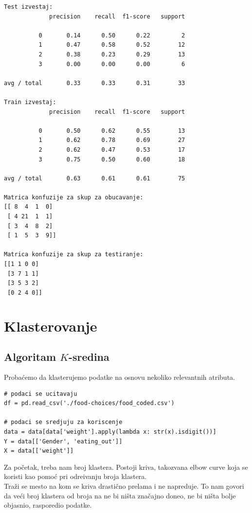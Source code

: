 \documentclass[12pt,a4paper]{article}
\begin{document}
\begin{verbatim}
Test izvestaj:
             precision    recall  f1-score   support

          0       0.14      0.50      0.22         2
          1       0.47      0.58      0.52        12
          2       0.38      0.23      0.29        13
          3       0.00      0.00      0.00         6

avg / total       0.33      0.33      0.31        33

Train izvestaj:
             precision    recall  f1-score   support

          0       0.50      0.62      0.55        13
          1       0.62      0.78      0.69        27
          2       0.62      0.47      0.53        17
          3       0.75      0.50      0.60        18

avg / total       0.63      0.61      0.61        75

Matrica konfuzije za skup za obucavanje:
[[ 8  4  1  0]
 [ 4 21  1  1]
 [ 3  4  8  2]
 [ 1  5  3  9]]

Matrica konfuzije za skup za testiranje:
[[1 1 0 0]
 [3 7 1 1]
 [3 5 3 2]
 [0 2 4 0]]
\end{verbatim}

\newpage

\section{Klasterovanje}

\subsection{Algoritam $K$-sredina}
Proba\' cemo da klasterujemo podatke na osnovu nekoliko relevantnih atributa.
\\
\begin{lstlisting}[mathescape=true]
# podaci se ucitavaju
df = pd.read_csv('./food-choices/food_coded.csv')

# podaci se sredjuju za koriscenje
data = data[data['weight'].apply(lambda x: str(x).isdigit())]
Y = data[['Gender', 'eating_out']]
X = data[['weight']]
\end{lstlisting}

Za po\v cetak, treba nam broj klastera. Postoji kriva, takozvana elbow curve koja se koristi kao pomo\' c pri odre\dj ivanju broja klastera.\\
Tra\v zi se mesto na kom se kriva drasti\v cno prelama i ne napreduje. To nam govori da ve\' ci broj klastera od broja na  ne bi ni\v sta zna\v cajno doneo, ne bi ni\v sta bolje objasnio, rasporedio podatke. 
\end{document}
